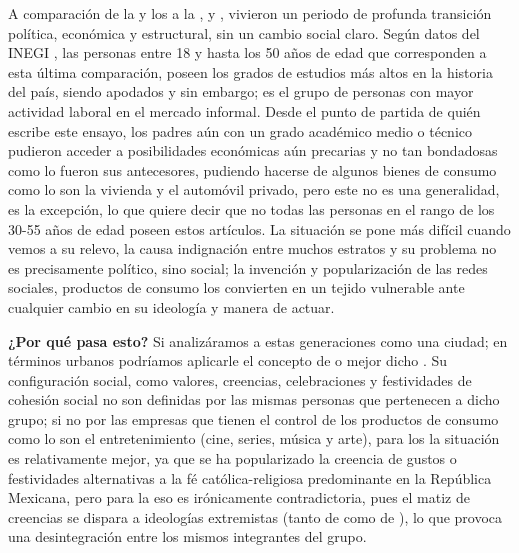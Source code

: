 A comparación de la  y los  a la ,  y
, vivieron un periodo de profunda transición política, económica y estructural, sin un cambio social claro.
Según datos del INEGI \cite{inegi_enoe_laboral}, las personas entre 18 y hasta los 50 años de edad que corresponden a esta última comparación,
poseen los grados de estudios más altos en la historia del país, siendo apodados  y sin embargo;
es el grupo de personas con mayor actividad laboral en el mercado informal. Desde el punto de partida de quién escribe este ensayo, los padres
aún con un grado académico medio o técnico pudieron acceder a posibilidades económicas aún precarias y no tan bondadosas como lo fueron
sus antecesores, pudiendo hacerse de algunos bienes de consumo como lo son la vivienda y el automóvil privado, pero este no es una generalidad,
es la excepción, lo que quiere decir que no todas las personas en el rango de los 30-55 años de edad poseen estos artículos. La situación
se pone más difícil cuando vemos a su relevo, la  causa indignación entre muchos estratos y su problema no es precisamente
político, sino social; la invención y popularización de las redes sociales, productos de consumo
 \cite{bauman_globalizacion_1999} los convierten en un tejido vulnerable ante cualquier
cambio en su ideología y manera de actuar.

\textbf{¿Por qué pasa esto?} Si analizáramos a estas generaciones como una ciudad; en términos urbanos
podríamos aplicarle el concepto de  o mejor dicho . Su configuración social, como valores,
creencias, celebraciones y festividades de cohesión social no son definidas por las mismas personas que pertenecen a dicho grupo; si no por las
empresas que tienen el control de los productos de consumo como lo son el entretenimiento (cine, series, música y arte), para los
 la situación es relativamente mejor, ya que se ha popularizado la creencia de gustos o festividades alternativas
a la fé católica-religiosa predominante en la República Mexicana, pero para la  eso es irónicamente contradictoria, pues el
matiz de creencias se dispara a ideologías extremistas (tanto de  como de ), lo que provoca una
desintegración entre los mismos integrantes del grupo.

